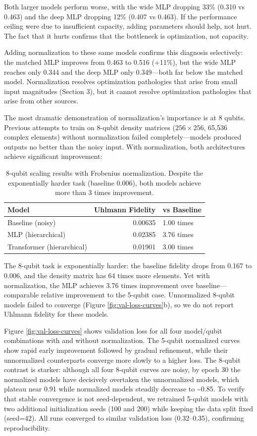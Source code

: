 \documentclass{ieeeqccl}
\begin{document}
Both larger models perform worse, with the wide MLP dropping 33\% (0.310 vs 0.463) and the deep MLP dropping 12\% (0.407 vs 0.463).  If the performance ceiling were due to insufficient capacity, adding parameters should help, not hurt.  The fact that it hurts confirms that the bottleneck is optimization, not capacity.

Adding normalization to these same models confirms this diagnosis selectively: the matched MLP improves from 0.463 to 0.516 (+11\%), but the wide MLP reaches only 0.344 and the deep MLP only 0.349---both far below the matched model.  Normalization resolves optimization pathologies that arise from small input magnitudes (Section 3), but it cannot resolve optimization pathologies that arise from other sources.

The most dramatic demonstration of normalization's importance is at 8 qubits.  Previous attempts to train on 8-qubit density matrices (\(256\times 256\), 65,536 complex elements) without normalization failed completely---models produced outputs no better than the noisy input.  With normalization, both architectures achieve significant improvement:

\begin{table}[htbp]
\caption{\label{tab:org89343d7}8-qubit scaling results with Frobenius normalization.  Despite the exponentially harder task (baseline 0.006), both models achieve more than 3 times improvement.}
\centering
\begin{tabular}{lrl}
Model & Uhlmann Fidelity & vs Baseline\\[0pt]
\hline
Baseline (noisy) & 0.00635 & 1.00 times\\[0pt]
MLP (hierarchical) & 0.02385 & 3.76 times\\[0pt]
Transformer (hierarchical) & 0.01901 & 3.00 times\\[0pt]
\end{tabular}
\end{table}

The 8-qubit task is exponentially harder: the baseline fidelity drops from 0.167 to 0.006, and the density matrix has 64 times more elements.  Yet with normalization, the MLP achieves 3.76 times improvement over baseline---comparable relative improvement to the 5-qubit case.  Unnormalized 8-qubit models failed to converge (Figure \ref{fig:val-loss-curves}b), so we do not report Uhlmann fidelity for these models.

Figure \ref{fig:val-loss-curves} shows validation loss for all four model/qubit combinations with and without normalization.  The 5-qubit normalized curves show rapid early improvement followed by gradual refinement, while their unnormalized counterparts converge more slowly to a higher loss.  The 8-qubit contrast is starker: although all four 8-qubit curves are noisy, by epoch 30 the normalized models have decisively overtaken the unnormalized models, which plateau near 0.91 while normalized models steadily decrease to \textasciitilde{}0.85.  To verify that stable convergence is not seed-dependent, we retrained 5-qubit models with two additional initialization seeds (100 and 200) while keeping the data split fixed (seed=42).  All runs converged to similar validation loss (0.32--0.35), confirming reproducibility.
\end{document}
